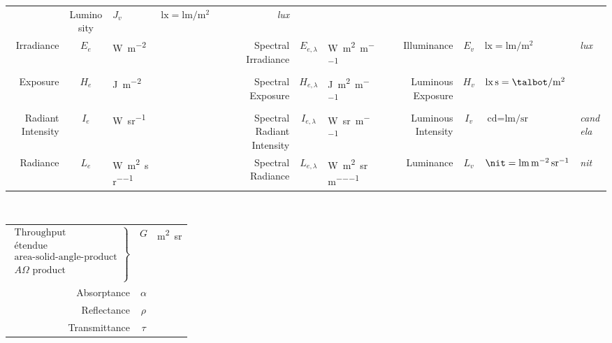 \begin{sidewaystable}
{\begin{tabular}{r c l l |@{$\;$} r c l l |@{$\;$} r c l l}
& Luminosity         & $J_v$           & $\unit{\lux} = \unit{\lumen\per\square\meter}$               & \textsl{lux} \\
%
  Irradiance          & $E_{e}$         & \unit{\watt\per\square\meter}                           &                  
& Spectral Irradiance & $E_{e,\lambda}$ & \unit{\watt\per\square\meter\per\meter}                 &                  
& Illuminance         & $E_v$           & $\unit{\lux} = \unit{\lumen\per\square\meter}$          & \textsl{lux}     \\
%
  Exposure          & $H_{e}$         & \unit{\joule\per\square\meter}                           &                  
& Spectral Exposure & $H_{e,\lambda}$ & \unit{\joule\per\square\meter\per\meter}                 &                  
& Luminous Exposure & $H_v$           & $\unit{\lux\second} = \unit{\talbot\per\square\meter}$   &  \\

%
  Radiant Intensity           & $I_{e}$         & \unit{\watt\per\steradian}                            &                  
& Spectral Radiant Intensity  & $I_{e,\lambda}$ & \unit{\watt\per\steradian\per\meter}                  &                  
& Luminous Intensity          & $I_v$           & $\unit{\candela} = \unit{\lumen\per\steradian}$       & \textsl{candela} \\
%
  Radiance           & $L_{e}$         & \unit{\watt\per\square\meter\per\steradian}                  &                  
& Spectral Radiance  & $L_{e,\lambda}$ & \unit{\watt\per\square\meter\per\steradian\per\meter}        &                  
& Luminance          & $L_v$           & $\unit{\nit} = \unit{\lumen\per\square\meter\per\steradian}$ & \textsl{nit}     \\
\end{tabular}\\[4mm]
\begin{tabular}{r @{\quad} c @{\quad} l}
$\left.
\begin{array}{r}
	\text{Throughput} \\ 
	\text{\'etendue} \\
	\text{area-solid-angle-product} \\
	A\Omega\text{ product} \\
\end{array}\right\}$    & $G$ & \unit{\square\meter\steradian} \\
Absorptance            & $\alpha$ & \\
Reflectance            & $\rho$ & \\
Transmittance          & $\tau$ & \\
\end{tabular}
\caption{Correspondence between radiometric and photometric units \label{tab:radiophoto}}

}
\end{sidewaystable}
